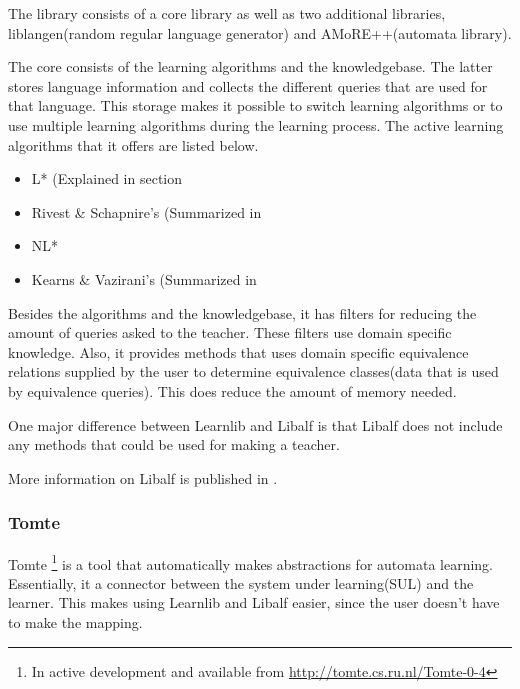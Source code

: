 \documentclass[multi,crop=false,class=article]{standalone}
\begin{document}
The library consists of a core library as well as two additional libraries, 
liblangen(random regular language generator) and AMoRE++(automata library).

The core consists of the learning algorithms and the knowledgebase. The latter 
stores language information and collects the different queries that are used 
for that language. This storage makes it possible to switch learning algorithms 
or to use multiple learning algorithms during the learning process. The active 
learning algorithms that it offers are listed below.

\begin{itemize}
	\item L* (Explained in section %
	\item Rivest \& Schapnire's (Summarized in 
	\item NL* \cite{Bollig2010}
	\item Kearns \& Vazirani's (Summarized in 
\end{itemize}

Besides the algorithms and the knowledgebase, it has filters for reducing the 
amount of queries asked to the teacher. These filters use domain specific 
knowledge. %
Also, it provides methods that uses domain specific equivalence relations 
supplied by the user to determine equivalence classes(data that is used by 
equivalence queries). This does reduce the amount of memory needed.

One major difference between Learnlib and Libalf is that Libalf does not 
include any methods that could be used for making a teacher. %

More information on Libalf is published in \cite{Bollig2010}.

\subsubsection{Tomte}
\label{sssec:tomte}
Tomte \footnote{In active development and available from 
\url{http://tomte.cs.ru.nl/Tomte-0-4}} is a tool that automatically makes 
abstractions for automata learning. Essentially, it a connector between the 
system under learning(SUL) and the learner. This makes using Learnlib and 
Libalf easier, since the user doesn't have to make the mapping.

\end{document}
